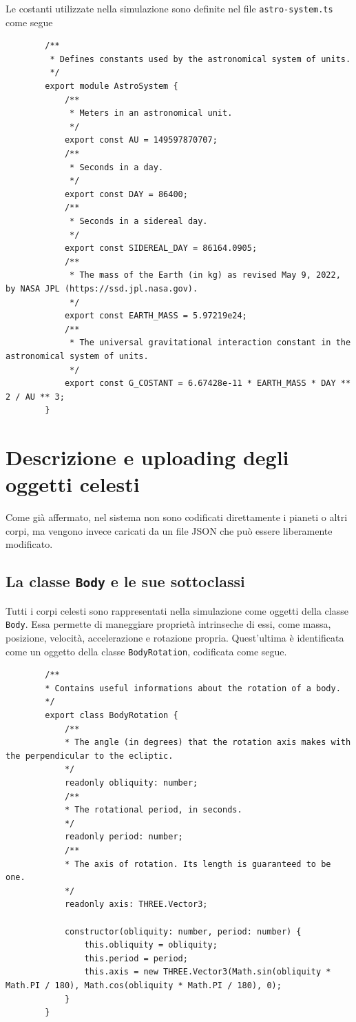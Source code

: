 \documentclass[11pt]{article}
\begin{document}
	Le costanti utilizzate nella simulazione sono definite nel file \texttt{astro-system.ts} come segue 
	\begin{verbatim}
		/**
		 * Defines constants used by the astronomical system of units.
		 */
		export module AstroSystem {
			/**
			 * Meters in an astronomical unit.
			 */
			export const AU = 149597870707;
			/**
			 * Seconds in a day.
			 */
			export const DAY = 86400;
			/**
			 * Seconds in a sidereal day.
			 */
			export const SIDEREAL_DAY = 86164.0905;
			/**
			 * The mass of the Earth (in kg) as revised May 9, 2022, by NASA JPL (https://ssd.jpl.nasa.gov).
			 */
			export const EARTH_MASS = 5.97219e24;
			/**
			 * The universal gravitational interaction constant in the astronomical system of units.
			 */
			export const G_COSTANT = 6.67428e-11 * EARTH_MASS * DAY ** 2 / AU ** 3;
		}
	\end{verbatim}

	\section{Descrizione e uploading degli oggetti celesti}

	Come già affermato, nel sistema non sono codificati direttamente i pianeti o altri corpi, ma vengono invece caricati da un file JSON che può essere liberamente modificato.

	\subsection[La classe Body e le sue sottoclassi]{La classe \texttt{Body} e le sue sottoclassi}

	Tutti i corpi celesti sono rappresentati nella simulazione come oggetti della classe \texttt{Body}. Essa permette di maneggiare proprietà intrinseche di essi, come massa, posizione, velocità, accelerazione e rotazione propria. Quest'ultima è identificata come un oggetto della classe \texttt{BodyRotation}, codificata come segue. 

	\begin{verbatim}
		/**
		* Contains useful informations about the rotation of a body.
		*/
		export class BodyRotation {
			/**
			* The angle (in degrees) that the rotation axis makes with the perpendicular to the ecliptic.
			*/
			readonly obliquity: number;
			/**
			* The rotational period, in seconds.
			*/
			readonly period: number;
			/**
			* The axis of rotation. Its length is guaranteed to be one. 
			*/
			readonly axis: THREE.Vector3;

			constructor(obliquity: number, period: number) {
				this.obliquity = obliquity;
				this.period = period;
				this.axis = new THREE.Vector3(Math.sin(obliquity * Math.PI / 180), Math.cos(obliquity * Math.PI / 180), 0);
			}
		}
	\end{verbatim}
\end{document}
